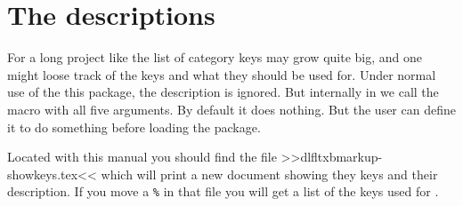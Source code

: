 \documentclass[11pt,oneside,a4paper,oldfontcommands,danish,english,article]{memoir}
\begin{document}
\section{The descriptions}
\label{sec:descriptions}

For a long project like \cite{ltxb} the list of category keys may grow
quite big, and one might loose track of the keys and what they should
be used for. Under normal use of the this package, the description is
ignored. But internally in  we call
the macro  with all five arguments. By
default it does nothing. But the user can define it to do something
before loading the package.

Located with this manual you should find the file
>>dlfltxbmarkup-showkeys.tex<< which will print a new document showing
they keys and their description. If you move a \texttt{\%} in that
file you will get a list of the keys used for \cite{ltxb}.




\end{document}
